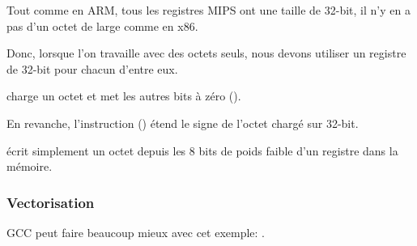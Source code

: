 Tout comme en ARM, tous les registres MIPS ont une taille de 32-bit, il n'y en a
pas d'un octet de large comme en x86.

Donc, lorsque l'on travaille avec des octets seuls, nous devons utiliser un registre
de 32-bit pour chacun d'entre eux.

 charge un octet et met les autres bits à zéro ().

En revanche, l'instruction  () étend le signe de l'octet chargé
sur 32-bit.

 écrit simplement un octet depuis les 8 bits de poids faible d'un registre
dans la mémoire.

\subsubsection{Vectorisation}

GCC \Optimizing peut faire beaucoup mieux avec cet exemple: .
